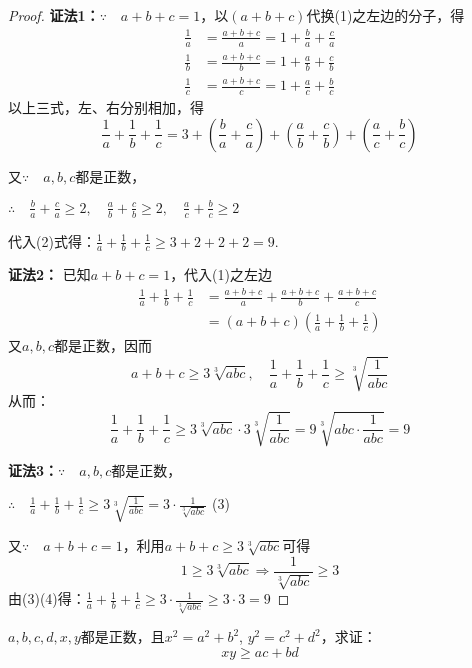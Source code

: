 \begin{proof}
\textbf{证法1：}$\because\quad a+b+c=1$，以$(a+b+c)$代换(1)之左边的分子，得
\[\begin{split}
    \frac{1}{a}&=\frac{a+b+c}{a}=1+\frac{b}{a}+\frac{c}{a}\\
    \frac{1}{b}&=\frac{a+b+c}{b}=1+\frac{a}{b}+\frac{c}{b}\\
    \frac{1}{c}&=\frac{a+b+c}{c}=1+\frac{a}{c}+\frac{b}{c}
\end{split} \]
以上三式，左、右分别相加，得
\begin{equation}
    \frac{1}{a}+\frac{1}{b}+\frac{1}{c}=3+\left(\frac{b}{a}+\frac{c}{a}\right)+\left(\frac{a}{b}+\frac{c}{b}\right)+\left(\frac{a}{c}+\frac{b}{c}\right) \tag{2}
\end{equation}

又$\because\quad a,b,c$都是正数，

$\therefore\quad \frac{b}{a}+\frac{c}{a}\ge 2,\quad \frac{a}{b}+\frac{c}{b}\ge 2,\quad \frac{a}{c}+\frac{b}{c}\ge 2$

代入(2)式得：$ \frac{1}{a}+\frac{1}{b}+\frac{1}{c}\ge 3+2+2+2=9$.

\textbf{证法2：} 已知$a+b+c=1$，代入(1)之左边
\[\begin{split}
    \frac{1}{a}+\frac{1}{b}+\frac{1}{c}&=\frac{a+b+c}{a}+\frac{a+b+c}{b}+\frac{a+b+c}{c}\\
    &=(a+b+c)\left(\frac{1}{a}+\frac{1}{b}+\frac{1}{c}\right)
\end{split}\]
又$a,b,c$都是正数，因而
\[a+b+c\ge 3\sqrt[3]{abc},\quad \frac{1}{a}+\frac{1}{b}+\frac{1}{c}\ge \sqrt[3]{\frac{1}{abc}}\]
从而：$$\frac{1}{a}+\frac{1}{b}+\frac{1}{c}\ge 3\sqrt[3]{abc}\cdot 3\sqrt[3]{\frac{1}{abc}}=9\sqrt[3]{abc\cdot \frac{1}{abc}}=9$$

\textbf{证法3：}$\because\quad a,b,c$都是正数，

$\therefore\quad \frac{1}{a}+\frac{1}{b}+\frac{1}{c}\ge 3\sqrt[3]{\frac{1}{abc}}=3\cdot \frac{1}{\sqrt[3]{abc}}$ \hfill (3)

又$\because\quad a+b+c=1$，利用$a+b+c\ge 3\sqrt[3]{abc}$可得
\begin{equation}
    1\ge 3\sqrt[3]{abc} \Longrightarrow \frac{1}{\sqrt[3]{abc}}\ge 3 \tag{4}
\end{equation}
由(3)(4)得：$\frac{1}{a}+\frac{1}{b}+\frac{1}{c}\ge 3\cdot \frac{1}{\sqrt[3]{abc}}\ge 3\cdot 3=9$
\end{proof}

\begin{example}
    $a,b,c,d,x,y$都是正数，且$x^2=a^2+b^2$, $y^2=c^2+d^2$，求证：
\begin{equation}
    xy\ge ac+bd \tag{1}
\end{equation}
\end{example}

